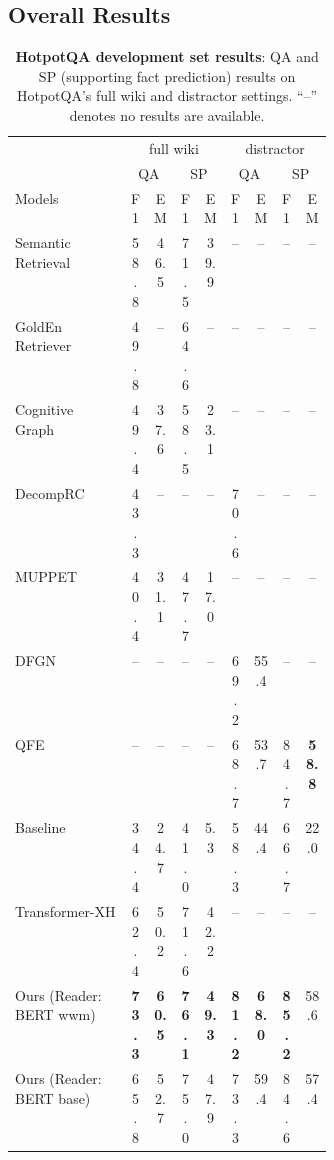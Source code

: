 \documentclass{article} \usepackage{iclr2020_conference,times}
\begin{document}
\subsection{Overall Results}
\label{sec:overall_results}
\begin{table}[!tb]
\centering
    \small{
\begin{tabular}{ p{0.37\linewidth} | c c |cc|cc | cc}\toprule 


 & \multicolumn{4}{c}{full wiki}  & \multicolumn{4}{c}{distractor}\\
& \multicolumn{2}{c}{QA}  & \multicolumn{2}{c}{SP}&\multicolumn{2}{c}{QA}  & \multicolumn{2}{c}{SP}\\
 Models  & F1 & EM  & F1 & EM & F1 & EM & F1 & EM \\
    \midrule


Semantic Retrieval \citep{nie_pip_2019} & 58.8 & 46.5 &71.5 &39.9 &-- &  -- &-- & --\\  
GoldEn Retriever~\citep{qi2019answering} & 49.8& -- &64.6 & -- &-- &  -- &-- & --\\  
Cognitive Graph \citep{cognitive_graph_2019} & 49.4 & 37.6 & 58.5& 23.1 & -- & -- &-- &-- \\
DecompRC \citep{min2019multi} & 43.3 & -- &  -- & -- &  70.6 & --　&  -- & --　\\
MUPPET \citep{muppet2019multihop} & 40.4 & 31.1 &47.7 & 17.0 & -- & -- & -- &-- \\
DFGN \citep{dynamic_multihop} & -- & -- & -- & -- &69.2 &  55.4 & --& -- \\ 
QFE \citep{nishida2019qfe} & -- & -- & -- & -- &68.7& 53.7 & 84.7 & \bf 58.8 \\ 
Baseline \citep{yang-etal-2018-hotpotqa} & 34.4 & 24.7& 41.0 &5.3 & 58.3 & 44.4 & 66.7 &  22.0\\  \hdashline
Transformer-XH \citep{zhao2020transformerxh}&  62.4 & 50.2 & 71.6 &42.2 & -- & -- & -- & -- \\  \hline
Ours (Reader: BERT wwm) & \bf 73.3 & \bf 60.5  & \bf 76.1 & \bf 49.3 & \bf 81.2 &  \bf 68.0 & \bf 85.2 & 58.6 \\
Ours (Reader: BERT base) &  65.8 & 52.7 & 75.0  & 47.9  & 73.3  & 59.4  & 84.6 & 57.4  \\
\bottomrule
\end{tabular}
    \caption{{\bf HotpotQA development set results}: QA and SP (supporting fact prediction) results on HotpotQA's full wiki and distractor settings. ``--'' denotes no results are available.
    }
    \label{table:dev_results_hotpot_qa}
    }
\end{table} 
\end{document}
